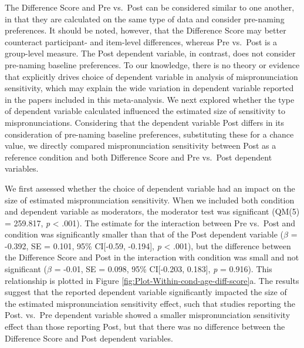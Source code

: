 \documentclass[man]{apa6}
\theoremstyle{definition}
\theoremstyle{definition}
\theoremstyle{definition}
\theoremstyle{remark}
\begin{document}
The Difference Score and Pre vs.~Post can be considered similar to one
another, in that they are calculated on the same type of data and
consider pre-naming preferences. It should be noted, however, that the
Difference Score may better counteract participant- and item-level
differences, whereas Pre vs.~Post is a group-level measure. The Post
dependent variable, in contrast, does not consider pre-naming baseline
preferences. To our knowledge, there is no theory or evidence that
explicitly drives choice of dependent variable in analysis of
mispronunciation sensitivity, which may explain the wide variation in
dependent variable reported in the papers included in this
meta-analysis. We next explored whether the type of dependent variable
calculated influenced the estimated size of sensitivity to
mispronunciations. Considering that the dependent variable Post differs
in its consideration of pre-naming baseline preferences, substituting
these for a chance value, we directly compared mispronunciation
sensitivity between Post as a reference condition and both Difference
Score and Pre vs.~Post dependent variables.

We first assessed whether the choice of dependent variable had an impact
on the size of estimated mispronunciation sensitivity. When we included
both condition and dependent variable as moderators, the moderator test
was significant (QM(5) = 259.817, \emph{p} \textless{} .001). The
estimate for the interaction between Pre vs.~Post and condition was
significantly smaller than that of the Post dependent variable
(\(\beta\) = -0.392, SE = 0.101, 95\% CI{[}-0.59, -0.194{]}, \emph{p}
\textless{} .001), but the difference between the Difference Score and
Post in the interaction with condition was small and not significant
(\(\beta\) = -0.01, SE = 0.098, 95\% CI{[}-0.203, 0.183{]}, \emph{p} =
0.916). This relationship is plotted in Figure
\ref{fig:Plot-Within-cond-age-diff-score}a. The results suggest that the
reported dependent variable significantly impacted the size of the
estimated mispronunciation sensitivity effect, such that studies
reporting the Post. vs.~Pre dependent variable showed a smaller
mispronunciation sensitivity effect than those reporting Post, but that
there was no difference between the Difference Score and Post dependent
variables.
\end{document}
